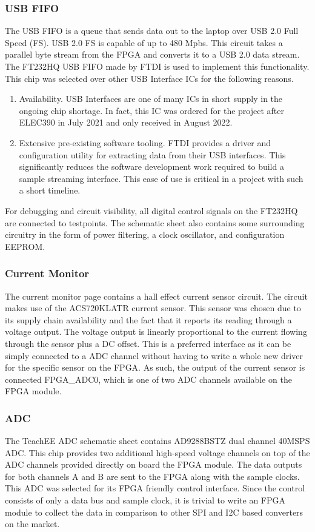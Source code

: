 \documentclass[letterpaper,11pt]{article}
\begin{document}
\subsubsection{USB FIFO}
The USB FIFO is a queue that sends data out to the laptop over USB 2.0 Full
Speed (FS). USB 2.0 FS is capable of up to 480 Mpbs. This circuit takes a
parallel byte stream from the FPGA and converts it to a USB 2.0 data stream. The
FT232HQ USB FIFO made by FTDI is used to implement this functionality. This chip
was selected over other USB Interface ICs for the following reasons.
  \begin{enumerate}
    \item Availability. USB Interfaces are one of many ICs in short supply
      in the ongoing chip shortage. In fact, this IC was ordered for the
      project after ELEC390 in July 2021 and only received in August 2022.
    \item Extensive pre-existing software tooling. FTDI provides a driver and
      configuration utility for extracting data from their USB interfaces. This
      significantly reduces the software development work required to build a
      sample streaming interface. This ease of use is critical in a project with
      such a short timeline.
  \end{enumerate}

For debugging and circuit visibility, all digital control signals on the
FT232HQ are connected to testpoints. The schematic sheet also contains some
surrounding circuitry in the form of power filtering, a clock oscillator, and
configuration EEPROM.

\subsubsection{Current Monitor}
The current monitor page contains a hall effect current sensor circuit. The
circuit makes use of the ACS720KLATR current sensor. This sensor was chosen due
to its supply chain availability and the fact that it reports its reading
through a voltage output. The voltage output is linearly proportional to the
current flowing through the sensor plus a DC offset. This is a preferred
interface as it can be simply connected to a ADC channel without having to write
a whole new driver for the specific sensor on the FPGA. As such, the output of
the current sensor is connected FPGA\_ADC0, which is one of two ADC channels
available on the FPGA module.

\subsubsection{ADC}
The TeachEE ADC schematic sheet contains AD9288BSTZ dual channel 40MSPS ADC.
This chip provides two additional high-speed voltage channels on top of the ADC
channels provided directly on board the FPGA module. The data outputs for both
channels A and B are sent to the FPGA along with the sample clocks. This ADC was
selected for its FPGA friendly control interface. Since the control consists of
only a data bus and sample clock, it is trivial to write an FPGA module to
collect the data in comparison to other SPI and I2C based converters on the
market.
\end{document}
